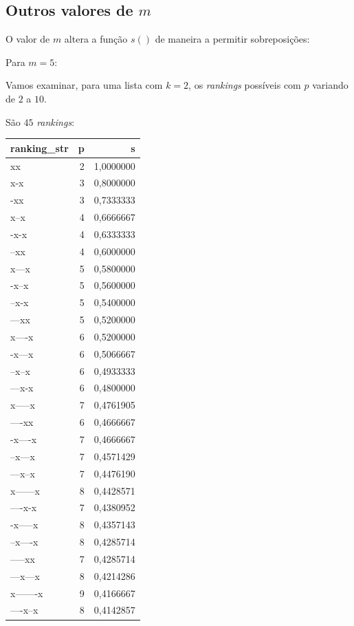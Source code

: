 \documentclass[
  letterpaper,
  DIV=11,
  numbers=noendperiod]{scrreprt}
\begin{document}
\subsection{\texorpdfstring{Outros valores de
$m$}{Outros valores de }}\label{outros-valores-de-m}

O valor de $m$ altera a função $s()$ de maneira a permitir
sobreposições:

Para $m = 5$:

Vamos examinar, para uma lista com $k = 2$, os \emph{rankings} possíveis
com $p$ variando de $2$ a $10$.

São $45$ \emph{rankings}:

\begin{longtable*}{lrr}
\toprule
ranking\_str & p & s \\ 
\midrule\addlinespace[2.5pt]
xx & 2 & 1,0000000 \\ 
x-x & 3 & 0,8000000 \\ 
-xx & 3 & 0,7333333 \\ 
x--x & 4 & 0,6666667 \\ 
-x-x & 4 & 0,6333333 \\ 
--xx & 4 & 0,6000000 \\ 
x---x & 5 & 0,5800000 \\ 
-x--x & 5 & 0,5600000 \\ 
--x-x & 5 & 0,5400000 \\ 
---xx & 5 & 0,5200000 \\ 
x----x & 6 & 0,5200000 \\ 
-x---x & 6 & 0,5066667 \\ 
--x--x & 6 & 0,4933333 \\ 
---x-x & 6 & 0,4800000 \\ 
x-----x & 7 & 0,4761905 \\ 
----xx & 6 & 0,4666667 \\ 
-x----x & 7 & 0,4666667 \\ 
--x---x & 7 & 0,4571429 \\ 
---x--x & 7 & 0,4476190 \\ 
x------x & 8 & 0,4428571 \\ 
----x-x & 7 & 0,4380952 \\ 
-x-----x & 8 & 0,4357143 \\ 
--x----x & 8 & 0,4285714 \\ 
-----xx & 7 & 0,4285714 \\ 
---x---x & 8 & 0,4214286 \\ 
x-------x & 9 & 0,4166667 \\ 
----x--x & 8 & 0,4142857 \\ 

\end{longtable*}
\end{document}
